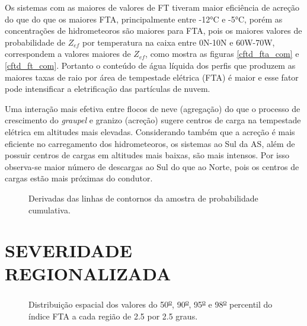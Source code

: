 Os sistemas com as maiores de valores de FT tiveram maior eficiência de acreção do que do que os maiores FTA, principalmente entre -12°C e -5°C, porém as concentrações de hidrometeoros são maiores para FTA, pois os maiores valores de probabilidade de $Z_{ef}$ por temperatura na caixa entre 0N-10N e 60W-70W, correspondem a valores maiores de $Z_{ef}$, como mostra as figuras \ref{cftd_fta_com} e \ref{cftd_ft_com}. Portanto o conteúdo de água líquida dos perfis que produzem as maiores taxas de raio por área de tempestade elétrica (FTA) é maior e esse fator pode intensificar a eletrificação das partículas de nuvem.

Uma interação mais efetiva entre flocos de neve (agregação) do que o processo de crescimento do \textit{graupel} e granizo (acreção) sugere centros de carga na tempestade elétrica em altitudes mais elevadas. Considerando também que a acreção é mais eficiente no carregamento dos hidrometeoros, os sistemas ao Sul da AS, além de possuir centros de cargas em altitudes mais baixas, são mais intensos. Por isso observa-se maior número de descargas ao Sul do que ao Norte, pois os centros de cargas estão mais próximas do condutor.



\begin{figure}
  \caption{Derivadas das linhas de contornos da amostra de probabilidade cumulativa.}
\end{figure}


\section{SEVERIDADE REGIONALIZADA}

\begin{figure}[!ht]
  \caption{Distribuição espacial dos valores do 50\textsuperscript{\underline{o}}, 90\textsuperscript{\underline{o}}, 95\textsuperscript{\underline{o}} e 98\textsuperscript{\underline{o}} percentil do índice FTA a cada região de 2.5 por 2.5 graus.}
\label{TaxaFlashArea}
\end{figure} 

